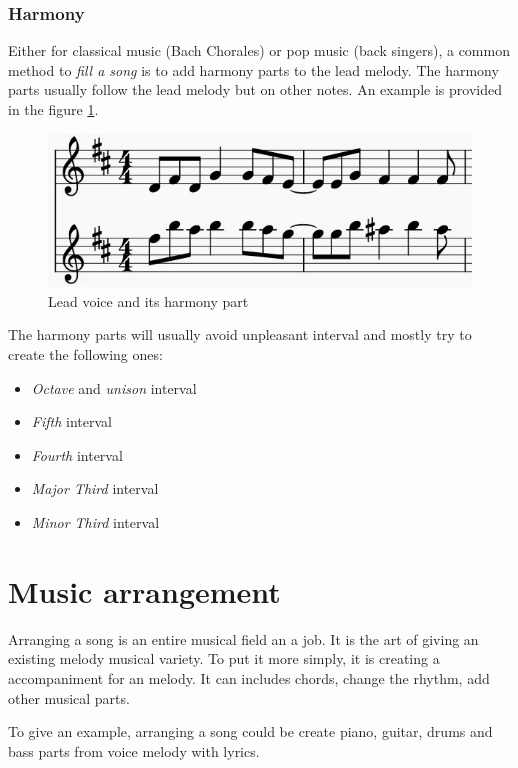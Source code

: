 \documentclass[12pt]{report}
\begin{document}
\subsubsection{Harmony}

Either for classical music (Bach Chorales) or pop music (back singers), a common method to \textit{fill a song} is to add harmony parts to the lead melody. The harmony parts usually follow the lead melody but on other notes.
An example is provided in the figure \ref{fig:harmony_example}.

\begin{figure}[H]
    \centering
    \includegraphics[width=0.75 \textwidth]{images/music/stave/harmony.jpg}
    \caption{Lead voice and its harmony part}
    \label{fig:harmony_example}
\end{figure}

The harmony parts will usually avoid unpleasant interval and mostly try to create the following ones: 
\begin{itemize}
    \item \textit{Octave} and \textit{unison} interval
    \item \textit{Fifth} interval
    \item \textit{Fourth} interval
    \item \textit{Major Third} interval
    \item \textit{Minor Third} interval
\end{itemize}



\section{Music arrangement}

Arranging a song is an entire musical field an a job.
It is the art of giving an existing melody musical variety.
To put it more simply, it is creating a accompaniment for an melody.
It can includes chords, change the rhythm, add other musical parts.

To give an example, arranging a song could be create piano, guitar, drums and bass parts from voice melody with lyrics.
\end{document}
